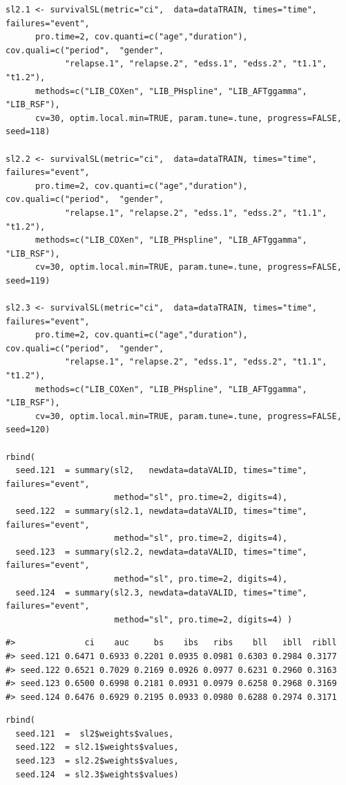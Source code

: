 \begin{verbatim}
sl2.1 <- survivalSL(metric="ci",  data=dataTRAIN, times="time", failures="event",
      pro.time=2, cov.quanti=c("age","duration"), cov.quali=c("period",  "gender",
            "relapse.1", "relapse.2", "edss.1", "edss.2", "t1.1", "t1.2"),
      methods=c("LIB_COXen", "LIB_PHspline", "LIB_AFTggamma", "LIB_RSF"),
      cv=30, optim.local.min=TRUE, param.tune=.tune, progress=FALSE, seed=118)

sl2.2 <- survivalSL(metric="ci",  data=dataTRAIN, times="time", failures="event",
      pro.time=2, cov.quanti=c("age","duration"), cov.quali=c("period",  "gender",
            "relapse.1", "relapse.2", "edss.1", "edss.2", "t1.1", "t1.2"),
      methods=c("LIB_COXen", "LIB_PHspline", "LIB_AFTggamma", "LIB_RSF"),
      cv=30, optim.local.min=TRUE, param.tune=.tune, progress=FALSE, seed=119)

sl2.3 <- survivalSL(metric="ci",  data=dataTRAIN, times="time", failures="event",
      pro.time=2, cov.quanti=c("age","duration"), cov.quali=c("period",  "gender",
            "relapse.1", "relapse.2", "edss.1", "edss.2", "t1.1", "t1.2"),
      methods=c("LIB_COXen", "LIB_PHspline", "LIB_AFTggamma", "LIB_RSF"),
      cv=30, optim.local.min=TRUE, param.tune=.tune, progress=FALSE, seed=120)

rbind(
  seed.121  = summary(sl2,   newdata=dataVALID, times="time", failures="event",
                      method="sl", pro.time=2, digits=4),
  seed.122  = summary(sl2.1, newdata=dataVALID, times="time", failures="event",
                      method="sl", pro.time=2, digits=4),
  seed.123  = summary(sl2.2, newdata=dataVALID, times="time", failures="event",
                      method="sl", pro.time=2, digits=4),
  seed.124  = summary(sl2.3, newdata=dataVALID, times="time", failures="event",
                      method="sl", pro.time=2, digits=4) )
\end{verbatim}

\begin{verbatim}
#>              ci    auc     bs    ibs   ribs    bll   ibll  ribll
#> seed.121 0.6471 0.6933 0.2201 0.0935 0.0981 0.6303 0.2984 0.3177
#> seed.122 0.6521 0.7029 0.2169 0.0926 0.0977 0.6231 0.2960 0.3163
#> seed.123 0.6500 0.6998 0.2181 0.0931 0.0979 0.6258 0.2968 0.3169
#> seed.124 0.6476 0.6929 0.2195 0.0933 0.0980 0.6288 0.2974 0.3171
\end{verbatim}

\begin{verbatim}
rbind(
  seed.121  =  sl2$weights$values,
  seed.122  = sl2.1$weights$values,
  seed.123  = sl2.2$weights$values,
  seed.124  = sl2.3$weights$values)
\end{verbatim}

